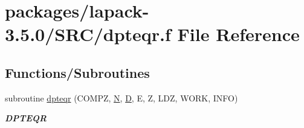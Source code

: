 \hypertarget{dpteqr_8f}{}\section{packages/lapack-\/3.5.0/\+S\+R\+C/dpteqr.f File Reference}
\label{dpteqr_8f}
\subsection*{Functions/\+Subroutines}
\begin{DoxyCompactItemize}
\item 
subroutine \hyperlink{group__doublePTcomputational_ga03d834df95ce593c02831f77602cfa7d}{dpteqr} (C\+O\+M\+P\+Z, \hyperlink{polmisc_8c_a0240ac851181b84ac374872dc5434ee4}{N}, \hyperlink{odrpack_8h_a7dae6ea403d00f3687f24a874e67d139}{D}, E, Z, L\+D\+Z, W\+O\+R\+K, I\+N\+F\+O)
\begin{DoxyCompactList}\small\item\em {\bfseries D\+P\+T\+E\+Q\+R} \end{DoxyCompactList}\end{DoxyCompactItemize}
